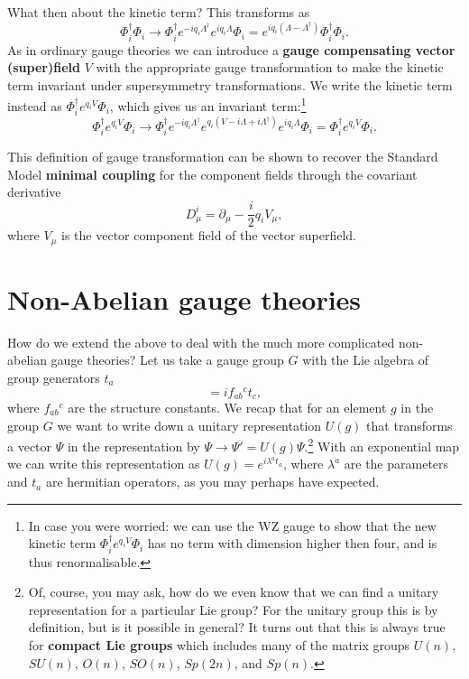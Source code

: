 \documentclass[notes.tex]{subfiles}
\begin{document}
What then about the kinetic term? This transforms as
\[\Phi^\dagger_i\Phi_i \to \Phi^\dagger_i e^{-iq_i\Lambda^\dagger }e^{iq_i\Lambda }\Phi_i = e^{iq_i(\Lambda - \Lambda^\dagger)}\Phi^\dagger_i\Phi_i.\]
As in  ordinary gauge theories we can introduce a {\bf gauge compensating vector (super)field} $V$ with the appropriate gauge transformation to make the kinetic term invariant under supersymmetry transformations. We write the kinetic term instead as $\Phi^\dagger_i e^{q_iV}\Phi_i$, which gives us an invariant term:\footnote{In case you were worried: we can use the WZ gauge to show that the new kinetic term $ \Phi^\dagger_ie^{q_iV}\Phi_i$ has no term with dimension higher then four, and is thus renormalisable.}
\[\Phi^\dagger_ie^{q_iV}\Phi_i \to \Phi^\dagger_i e^{-iq_i\Lambda^\dagger }e^{q_i(V - i\Lambda + i\Lambda^\dagger)}e^{iq_i\Lambda}\Phi_i = \Phi^\dagger_ie^{q_iV}\Phi_i.\]

This definition of gauge transformation can be shown to recover the Standard  Model {\bf minimal coupling} for the component fields through the covariant derivative
\[D_\mu^i = \partial_\mu -\frac{i}{2}q_iV_\mu,\]
where $V_\mu$ is the vector component field of the vector superfield.



\section{Non-Abelian gauge theories}
How do we extend the above to deal with the much more complicated non-abelian gauge theories? Let us take a gauge group $G$ with the Lie algebra of group generators $t_a$ 
\begin{equation}
[t_a, t_b] = if_{ab}{}^c t_c,\label{eq:Liealgebrawta}
\end{equation} 
where $f_{ab}{}^{c}$ are the structure constants. We recap that for an element $g$ in the group $G$ we want to write down a unitary representation $U(g)$ that transforms a vector $\Psi$  in the representation by $\Psi \to \Psi' = U(g)\Psi$.\footnote{Of, course, you may ask, how do we even know that we can find a unitary representation for a particular Lie group? For the unitary group this is by definition, but is it possible in general? It turns out that this is always true for {\bf compact Lie groups} which includes many of the matrix groups $U(n)$, $SU(n)$, $O(n)$, $SO(n)$, $Sp(2n)$, and $Sp(n)$.}  
With an exponential map we can write this representation as $U(g) = e^{i\lambda^a t_a}$, where $\lambda^a$ are the parameters and $t_a$ are hermitian operators, as you may perhaps have expected.
\end{document}

